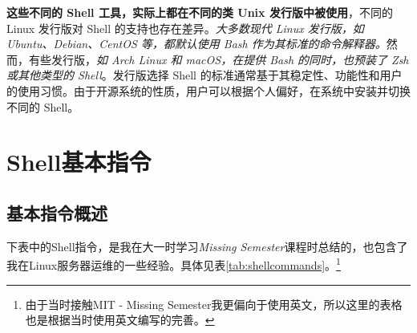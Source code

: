 \textbf{这些不同的 Shell 工具，实际上都在不同的类 Unix 发行版中被使用}，不同的 Linux 发行版对 Shell 的支持也存在差异。\textit{大多数现代 Linux 发行版，如 Ubuntu、Debian、CentOS 等，都默认使用 Bash 作为其标准的命令解释器。}然而，有些发行版，\textit{如 Arch Linux 和 macOS，在提供 Bash 的同时，也预装了 Zsh 或其他类型的 Shell}。发行版选择 Shell 的标准通常基于其稳定性、功能性和用户的使用习惯。由于开源系统的性质，用户可以根据个人偏好，在系统中安装并切换不同的 Shell。

\section{Shell基本指令}

\subsection{基本指令概述}

下表中的Shell指令，是我在大一时学习\textit{Missing Semester}课程时总结的，也包含了我在Linux服务器运维的一些经验。具体见表\ref{tab:shellcommands}。\footnote{由于当时接触MIT - Missing Semester我更偏向于使用英文，所以这里的表格也是根据当时使用英文编写的完善。}

